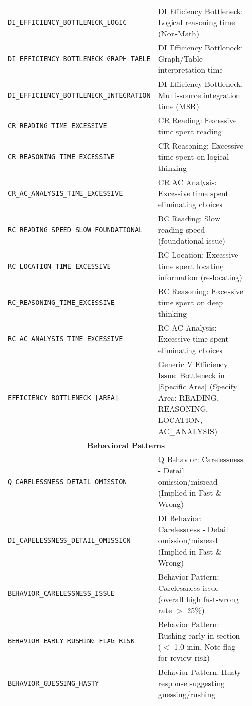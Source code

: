 \documentclass{article}
\begin{document}
{\begin{longtable}{|l|p{}|}
\texttt{DI\_EFFICIENCY\_BOTTLENECK\_LOGIC} & DI Efficiency Bottleneck: Logical reasoning time (Non-Math) \\
\texttt{DI\_EFFICIENCY\_BOTTLENECK\_GRAPH\_TABLE} & DI Efficiency Bottleneck: Graph/Table interpretation time \\
\texttt{DI\_EFFICIENCY\_BOTTLENECK\_INTEGRATION} & DI Efficiency Bottleneck: Multi-source integration time (MSR) \\
\texttt{CR\_READING\_TIME\_EXCESSIVE} & CR Reading: Excessive time spent reading \\
\texttt{CR\_REASONING\_TIME\_EXCESSIVE} & CR Reasoning: Excessive time spent on logical thinking \\
\texttt{CR\_AC\_ANALYSIS\_TIME\_EXCESSIVE} & CR AC Analysis: Excessive time spent eliminating choices \\
\texttt{RC\_READING\_SPEED\_SLOW\_FOUNDATIONAL} & RC Reading: Slow reading speed (foundational issue) \\
\texttt{RC\_LOCATION\_TIME\_EXCESSIVE} & RC Location: Excessive time spent locating information (re-locating) \\
\texttt{RC\_REASONING\_TIME\_EXCESSIVE} & RC Reasoning: Excessive time spent on deep thinking \\
\texttt{RC\_AC\_ANALYSIS\_TIME\_EXCESSIVE} & RC AC Analysis: Excessive time spent eliminating choices \\
\texttt{EFFICIENCY\_BOTTLENECK\_[AREA]} & Generic V Efficiency Issue: Bottleneck in [Specific Area] (Specify Area: READING, REASONING, LOCATION, AC\_ANALYSIS) \\
\hline
\multicolumn{2}{|c|}{\textbf{Behavioral Patterns}} \\
\hline
\texttt{Q\_CARELESSNESS\_DETAIL\_OMISSION} & Q Behavior: Carelessness - Detail omission/misread (Implied in Fast \& Wrong) \\
\texttt{DI\_CARELESSNESS\_DETAIL\_OMISSION} & DI Behavior: Carelessness - Detail omission/misread (Implied in Fast \& Wrong) \\
\texttt{BEHAVIOR\_CARELESSNESS\_ISSUE} & Behavior Pattern: Carelessness issue (overall high fast-wrong rate $>$ 25\%) \\
\texttt{BEHAVIOR\_EARLY\_RUSHING\_FLAG\_RISK} & Behavior Pattern: Rushing early in section ($<$ 1.0 min, Note flag for review risk) \\
\texttt{BEHAVIOR\_GUESSING\_HASTY} & Behavior Pattern: Hasty response suggesting guessing/rushing \\

\end{longtable} %

} %
\end{document}
